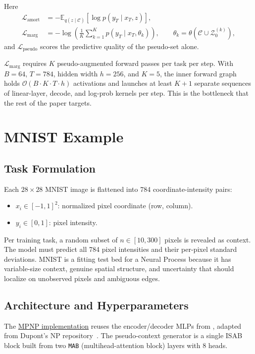 \documentclass[11pt]{article}
\begin{document}
Here
\begin{align}
	\mathcal{L}_{\text{amort}}
	 & = -\mathbb{E}_{q(z\mid\mathcal{C})}\left[\log p(y_T \mid x_T, z)\right], \\
	\mathcal{L}_{\text{marg}}
	 & = -\log\left(\frac{1}{K}\sum_{k=1}^{K} p(y_T \mid x_T, \theta_k)\right),
	\qquad \theta_k = \theta\left(\mathcal{C} \cup \mathcal{Z}_0^{(k)}\right),
\end{align}
and $\mathcal{L}_{\text{pseudo}}$ scores the predictive quality of the
pseudo-set alone.

$\mathcal{L}_{\text{marg}}$ requires $K$ pseudo-augmented forward passes
per task per step. With $B = 64$, $T = 784$, hidden width $h = 256$, and
$K = 5$, the inner forward graph holds
$\mathcal{O}(B \cdot K \cdot T \cdot h)$ activations and launches at
least $K{+}1$ separate sequences of linear-layer, decode, and log-prob
kernels per step. This is the bottleneck that the rest of the paper
targets.

\section{MNIST Example}

\subsection{Task Formulation}

Each $28\times28$ MNIST image is flattened into 784 coordinate-intensity
pairs:

\begin{itemize}
	\item $x_i \in {[-1, 1]}^2$: normalized pixel coordinate (row, column).
	\item $y_i \in [0, 1]$: pixel intensity.
\end{itemize}

Per training task, a random subset of $n \in [10, 300]$ pixels is
revealed as context. The model must predict all 784 pixel intensities
and their per-pixel standard deviations. MNIST is a fitting test bed for
a Neural Process because it has variable-size context, genuine spatial
structure, and uncertainty that should localize on unobserved pixels and
ambiguous edges.

\subsection{Architecture and Hyperparameters}

The \href{../martingale_posterior_neural_process.py}{MPNP implementation}
reuses the encoder/decoder MLPs from
\href{../neural_process.py}{}, adapted from Dupont's
NP repository~\cite{dupont}. The pseudo-context generator is a single ISAB
block built from two \texttt{MAB} (multihead-attention block) layers with 8
heads.
\end{document}
